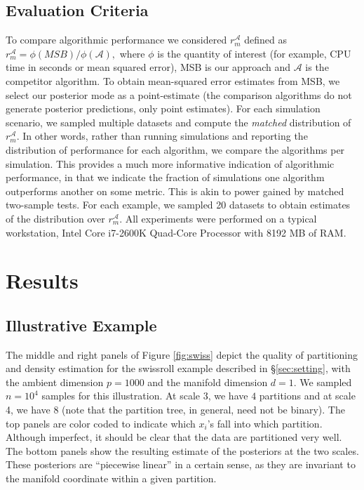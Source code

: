 \documentclass{article} %
\providecommand{\mc}[1]{\mathcal{#1}}
\begin{document}
\subsection{Evaluation Criteria}

To compare algorithmic performance we considered $r_{m}^{\mc{A}}$ defined as $r_{m}^{\mc{A}}=\phi(MSB)/\phi(\mc{A}),$
where $\phi$ is the quantity of interest (for example, CPU time in seconds or mean squared error), MSB is our approach and $\mc{A}$ is the competitor algorithm. To obtain mean-squared error estimates from MSB, we select our posterior mode as a point-estimate (the comparison algorithms do not generate posterior predictions, only point estimates).
For each simulation scenario, we sampled multiple datasets and compute the \emph{matched} distribution of $r_{m}^{\mc{A}}$. In other words, rather than running simulations and reporting the distribution of performance for each algorithm, we compare the algorithms per simulation.  This provides a much more informative indication of algorithmic performance, in that we indicate the fraction of simulations one algorithm outperforms another on some metric.  This is akin to power gained by matched two-sample tests.   For each example, we sampled 20 datasets to obtain estimates of the distribution over $r_m^{\mc{A}}$.
% 
All experiments were performed on a typical workstation, Intel Core i7-2600K Quad-Core Processor with  8192 MB of RAM.



\section{Results}

\subsection{Illustrative Example} \label{sub:ill}

The middle and right panels of Figure \ref{fig:swiss} depict the quality of partitioning and density estimation for the swissroll example described in \S \ref{sec:setting}, with the ambient dimension $p=1000$ and the manifold dimension $d=1$.  We sampled $n=10^4$ samples for this illustration. At scale 3, we have $4$ partitions and at scale 4, we have $8$ (note that the partition tree, in general, need not be binary).  The top panels are color coded to indicate which  $x_i$'s fall into which partition.  Although imperfect, it should be clear that the data are partitioned very well.  The bottom panels show the resulting estimate of the posteriors at the two scales.  These posteriors are ``piecewise linear'' in a certain sense, as they are invariant to the manifold coordinate within a given partition.  
\end{document}
